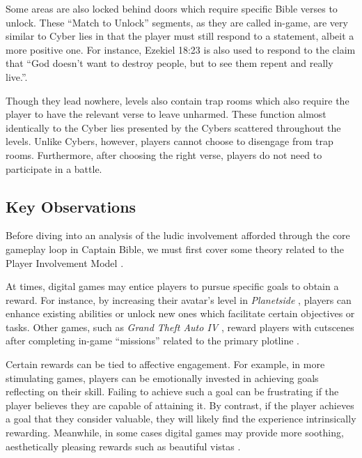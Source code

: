 Some areas are also locked behind doors which require specific Bible verses to unlock. These ``Match to Unlock'' segments, as they are called in-game, are very similar to Cyber lies in that the player must still respond to a statement, albeit a more positive one. For instance, Ezekiel 18:23 \parencite{new_international_version_2011} is also used to respond to the claim that ``God doesn't want to destroy people, but to see them repent and really live.''.

Though they lead nowhere, levels also contain trap rooms which also require the player to have the relevant verse to leave unharmed. These function almost identically to the Cyber lies presented by the Cybers scattered throughout the levels. Unlike Cybers, however, players cannot choose to disengage from trap rooms. Furthermore, after choosing the right verse, players do not need to participate in a battle.

\subsection{Key Observations} \label{sec:captain_key_observations}

Before diving into an analysis of the ludic involvement afforded through the core gameplay loop in Captain Bible, we must first cover some theory related to the Player Involvement Model \parencite{calleja_in_game_2011}.

At times, digital games may entice players to pursue specific goals to obtain a reward. For instance, by increasing their avatar's level in \textit{Planetside} \parencite{rogue_planet_games_planetside_2003}, players can enhance existing abilities or unlock new ones which facilitate certain objectives or tasks. Other games, such as \textit{Grand Theft Auto IV} \parencite{rockstar_north_grand_2008}, reward players with cutscenes after completing in-game ``missions'' related to the primary plotline \parencite[Chapters 7, 9]{calleja_in_game_2011}.

Certain rewards can be tied to affective engagement. For example, in more stimulating games, players can be emotionally invested in achieving goals reflecting on their skill. Failing to achieve such a goal can be frustrating if the player believes they are capable of attaining it. By contrast, if the player achieves a goal that they consider valuable, they will likely find the experience intrinsically rewarding. Meanwhile, in some cases digital games may provide more soothing, aesthetically pleasing rewards such as beautiful vistas \parencite[Chapters 5, 8, 9]{calleja_in_game_2011}.

